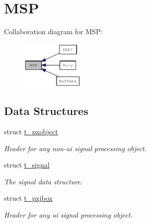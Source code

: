 \hypertarget{group__msp}{
\section{MSP}
\label{group__msp}
}


Collaboration diagram for MSP:\nopagebreak
\begin{figure}[H]
\begin{center}
\leavevmode
\includegraphics[width=86pt]{group__msp}
\end{center}
\end{figure}
\subsection*{Data Structures}
\begin{DoxyCompactItemize}
\item 
struct \hyperlink{structt__pxobject}{t\_\-pxobject}
\begin{DoxyCompactList}\small\item\em Header for any non-\/ui signal processing object. \item\end{DoxyCompactList}\item 
struct \hyperlink{structt__signal}{t\_\-signal}
\begin{DoxyCompactList}\small\item\em The signal data structure. \item\end{DoxyCompactList}\item 
struct \hyperlink{structt__pxjbox}{t\_\-pxjbox}
\begin{DoxyCompactList}\small\item\em Header for any ui signal processing object. \item\end{DoxyCompactList}\end{DoxyCompactItemize}
